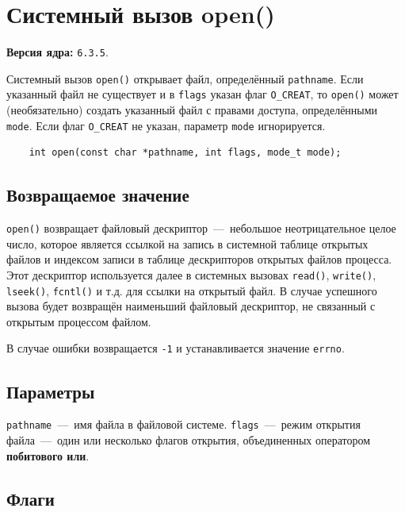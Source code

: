 \chapter{Системный вызов open()} 

\noindent\textbf{Версия ядра:} \texttt{6.3.5}.


Системный вызов \texttt{open()} открывает файл, определённый \texttt{pathname}. Если указанный файл не существует и в \texttt{flags} указан флаг \texttt{O\_CREAT}, то \texttt{open()} может (необязательно) создать указанный файл с правами доступа, определёнными \texttt{mode}. Если флаг \texttt{O\_CREAT} не указан, параметр \texttt{mode} игнорируется.

\begin{lstlisting}
	int open(const char *pathname, int flags, mode_t mode);
\end{lstlisting}

\section{Возвращаемое значение}

\texttt{open()} возвращает файловый дескриптор~---~небольшое неотрицательное целое число, которое является ссылкой на запись в системной таблице открытых файлов и индексом записи в таблице дескрипторов открытых файлов процесса. Этот дескриптор используется далее в системных вызовах \texttt{read()}, \texttt{write()}, \texttt{lseek()}, \texttt{fcntl()} и т.д. для ссылки на открытый файл. В случае успешного вызова будет возвращён наименьший файловый дескриптор, не связанный с открытым процессом файлом.

В случае ошибки возвращается \texttt{-1} и устанавливается значение \texttt{errno}.

\section{Параметры}

\texttt{pathname}~---~имя файла в файловой системе. \texttt{flags}~---~режим открытия файла~---~один или несколько флагов открытия, объединенных оператором \textbf{побитового или}. 

\section{Флаги}

